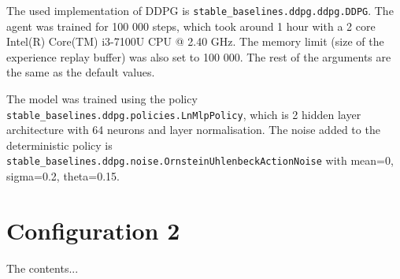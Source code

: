 \documentclass[class=book, crop=false]{standalone}
\begin{document}
The used implementation of DDPG is \texttt{stable\_baselines.ddpg.ddpg.DDPG}. The agent was trained for 100 000 steps, which took around 1 hour with a 2 core Intel(R) Core(TM) i3-7100U CPU @ 2.40 GHz. The memory limit (size of the experience replay buffer) was also set to 100 000. The rest of the arguments are the same as the default values. 

The model was trained using the policy \texttt{stable\_baselines.ddpg.policies.LnMlpPolicy}, which is 2 hidden layer architecture with 64 neurons and layer normalisation. The noise added to the deterministic policy is \texttt{stable\_baselines.ddpg.noise.OrnsteinUhlenbeckActionNoise} with mean=0, sigma=0.2, theta=0.15.  


\section{Configuration 2}
The contents...
\end{document}
